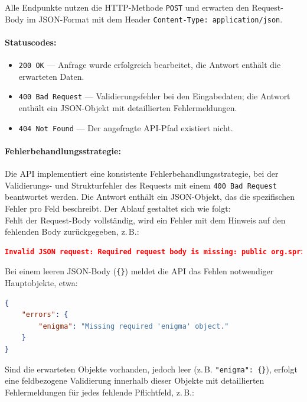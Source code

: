 \documentclass[12pt, ngerman, a4paper, numbers=noenddot]{article}
\begin{document}
Alle Endpunkte nutzen die HTTP\hyp{}Methode \lstinline|POST| und erwarten den Request-Body im JSON-Format mit dem Header \lstinline|Content-Type: application/json|.

\paragraph{Statuscodes:}

\begin{itemize}
	\item \lstinline|200 OK| — Anfrage wurde erfolgreich bearbeitet, die Antwort enthält die erwarteten Daten.
	\item \lstinline|400 Bad Request| — Validierungsfehler bei den Eingabedaten; die Antwort enthält ein JSON-Objekt mit detaillierten Fehlermeldungen.
	\item \lstinline|404 Not Found| — Der angefragte API-Pfad existiert nicht.
\end{itemize}


\paragraph{Fehlerbehandlungsstrategie:}

Die API implementiert eine konsistente Fehlerbehandlungsstrategie, bei der Validierungs- und Strukturfehler des Requests mit einem \lstinline|400 Bad Request| beantwortet werden. Die Antwort enthält ein JSON-Objekt, das die spezifischen Fehler pro Feld beschreibt. Der Ablauf gestaltet sich wie folgt:\\


Fehlt der Request-Body vollständig, wird ein Fehler mit dem Hinweis auf den fehlenden Body zurückgegeben, z.\,B.:

\begin{lstlisting}[language=json]
Invalid JSON request: Required request body is missing: public org.springframework.http.ResponseEntity<?> ...
\end{lstlisting}

Bei einem leeren JSON-Body (\lstinline|{}|) meldet die API das Fehlen notwendiger Hauptobjekte, etwa:

\begin{lstlisting}[language=json]
{
	"errors": {
		"enigma": "Missing required 'enigma' object."
	}
}
\end{lstlisting}

Sind die erwarteten Objekte vorhanden, jedoch leer (z.\,B. \lstinline|"enigma": {}|), erfolgt eine feldbezogene Validierung innerhalb dieser Objekte mit detaillierten Fehlermeldungen für jedes fehlende Pflichtfeld, z.\,B.:
\end{document}
